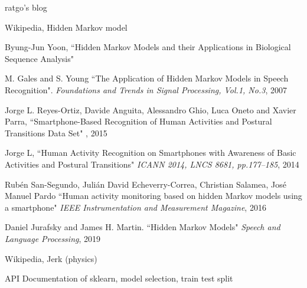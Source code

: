 \documentclass[10pt,twocolumn,letterpaper]{article}
\begin{document}
\begin{thebibliography}{9}

ratgo’s blog

Wikipedia, Hidden Markov model

Byung-Jun Yoon, 
``Hidden Markov Models and their Applications in Biological Sequence Analysis"

M. Gales and S. Young
``The Application of Hidden Markov Models in Speech Recognition".
{\textit{Foundations and Trends in Signal Processing, Vol.1, No.3}, 2007}

Jorge L. Reyes-Ortiz, Davide Anguita, Alessandro Ghio, Luca Oneto and Xavier Parra,
``Smartphone-Based Recognition of Human Activities and Postural Transitions Data Set"
, 2015

Jorge L, \etal
``Human Activity Recognition on Smartphones with Awareness of Basic Activities and Postural Transitions"
{\textit{ICANN 2014, LNCS 8681, pp.177–185}, 2014}

Rubén San-Segundo, Julián David Echeverry-Correa, Christian Salamea, José Manuel Pardo
``Human activity monitoring based on hidden Markov models using a smartphone"
{\textit{IEEE Instrumentation and Measurement Magazine}, 2016}

Daniel Jurafsky and James H. Martin.
``Hidden Markov Models"
{\textit{Speech and Language Processing}, 2019}

Wikipedia, Jerk (physics)

API Documentation of sklearn, model selection, train test split


\end{thebibliography}
\end{document}
